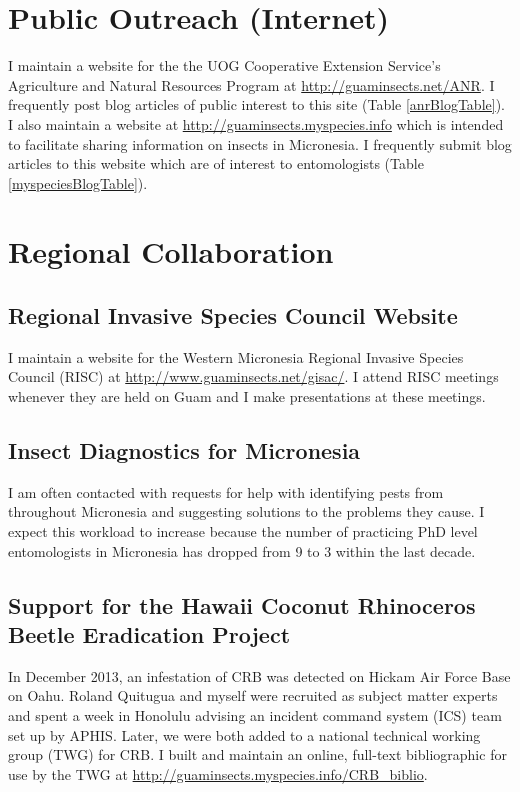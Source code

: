 \documentclass[12pt,oneside,english]{scrbook}
\begin{document}
\section{Public Outreach (Internet)}

I maintain a website for the the UOG Cooperative Extension Service's
Agriculture and Natural Resources Program at \url{http://guaminsects.net/ANR}.
I frequently post blog articles of public interest to this site (Table
\ref{anrBlogTable}). I also maintain a website at \url{http://guaminsects.myspecies.info}
which is intended to facilitate sharing information on insects in
Micronesia. I frequently submit blog articles to this website which
are of interest to entomologists (Table \ref{myspeciesBlogTable}). 

\section{Regional Collaboration }

\subsection{Regional Invasive Species Council Website}

I maintain a website for the Western Micronesia Regional Invasive
Species Council (RISC) at \url{http://www.guaminsects.net/gisac/}.
I attend RISC meetings whenever they are held on Guam and I make presentations
at these meetings.

\subsection{Insect Diagnostics for Micronesia}

I am often contacted with requests for help with identifying pests
from throughout Micronesia and suggesting solutions to the problems
they cause. I expect this workload to increase because the number
of practicing PhD level entomologists in Micronesia has dropped from
9 to 3 within the last decade.

\subsection{\label{sub:Hawaii CRB}Support for the Hawaii Coconut Rhinoceros
Beetle Eradication Project}

In December 2013, an infestation of CRB was detected on Hickam Air
Force Base on Oahu. Roland Quitugua and myself were recruited as subject
matter experts and spent a week in Honolulu advising an incident command
system (ICS) team set up by APHIS. Later, we were both added to a
national technical working group (TWG) for CRB. I built and maintain
an online, full-text bibliographic for use by the TWG at \url{http://guaminsects.myspecies.info/CRB_biblio}.
\end{document}
